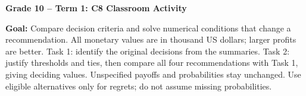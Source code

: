 \makeatletter
{}
\makeatother

\pagestyle{empty}
\newenvironment{studentproblem}{\par\addvspace{4pt}\noindent\begin{minipage}{\linewidth}}{\end{minipage}\par}
\newcommand{\tasktwobox}{%
  \par\smallskip\noindent
  \begingroup\setlength{\fboxsep}{0pt}%
  \fbox{\parbox[c][20mm][c]{\dimexpr\linewidth-2\fboxrule\relax}{\mbox{}}}%
  \endgroup\par}
\newcommand{\choices}{\begin{center}\begin{tabular}{lcc}\toprule Criterion & Alternative(s) & Deciding quantity and value\\\midrule Maximax & \rule{25mm}{0.4pt} & \rule{45mm}{0.4pt}\\ Maximin & \rule{25mm}{0.4pt} & \rule{45mm}{0.4pt}\\ Minimax Regret & \rule{25mm}{0.4pt} & \rule{45mm}{0.4pt}\\ EMV/Bayes & \rule{25mm}{0.4pt} & \rule{45mm}{0.4pt}\\\bottomrule\end{tabular}\end{center}}

\begingroup\renewcommand{\baselinestretch}{1}\small
\setlength{\parskip}{2pt}\renewcommand{\arraystretch}{1.02}
\renewenvironment{center}{\par\vspace{2pt}\centering\footnotesize}{\par\vspace{2pt}}
\begin{center}{\large\bfseries Grade 10 -- Term 1: C8 Classroom Activity}\end{center}
\textbf{Goal:} Compare decision criteria and solve numerical conditions that change a recommendation.
All monetary values are in thousand US dollars; larger profits are better. Task 1: identify the original decisions from the summaries. Task 2: justify thresholds and ties, then compare all four recommendations with Task 1, giving deciding values. Unspecified payoffs and probabilities stay unchanged. Use eligible alternatives only for regrets; do not assume missing probabilities.

